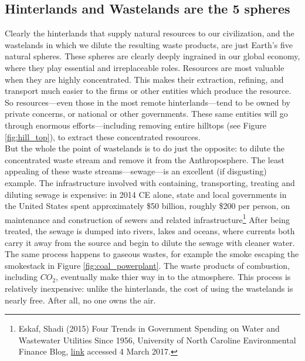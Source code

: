 \documentclass[amstex,12pt]{book}
\begin{document}
\subsection{Hinterlands and Wastelands are the 5 spheres}
Clearly the hinterlands that supply natural resources to our civilization, and the wastelands in which we dilute the resulting waste products, are just Earth's five natural spheres. These spheres are clearly deeply ingrained in our global economy, where they play essential and irreplaceable roles. Resources are most valuable when they are highly concentrated. This makes their extraction, refining, and transport much easier to the firms or other entities which produce the resource. So resources---even those in the most remote hinterlands---tend to be owned by private concerns, or national or other governments. These same entities will go through enormous efforts---including removing entire hilltops (see Figure \ref{fig:hill_top}), to extract these concentrated resources. \\

But the whole the point of wastelands is to do just the opposite: to dilute the concentrated waste stream and remove it from the Anthroposphere. The least appealing of these waste streams---sewage---is an excellent (if disgusting) example. The infrastructure involved with containing, transporting, treating and diluting sewage is expensive: in 2014 CE alone, state and local governments in the United States spent approximately \$50 billion, roughly \$200 per person, on maintenance and construction of sewers and related infrastructure\footnote{Eskaf, Shadi (2015) Four Trends in Government Spending on Water and Wastewater Utilities Since 1956, University of North Caroline Environmental Finance Blog, \href{http://efc.web.unc.edu/2015/09/09/four-trends-government-spending-water/}{link} accessed 4 March 2017.} After being treated, the sewage is dumped into rivers, lakes and oceans, where currents both carry it away from the source and begin to dilute the sewage with cleaner water.\\

The same process happens to gaseous wastes, for example the smoke escaping the smokestack in Figure \ref{fig:coal_powerplant}. The waste products of combustion, including $CO_2$, eventually make thier way in to the atmosphere. This process is relatively inexpensive: unlike the hinterlands, the cost of using the wastelands is nearly free. After all, no one owns the air.\\ 
\end{document}

